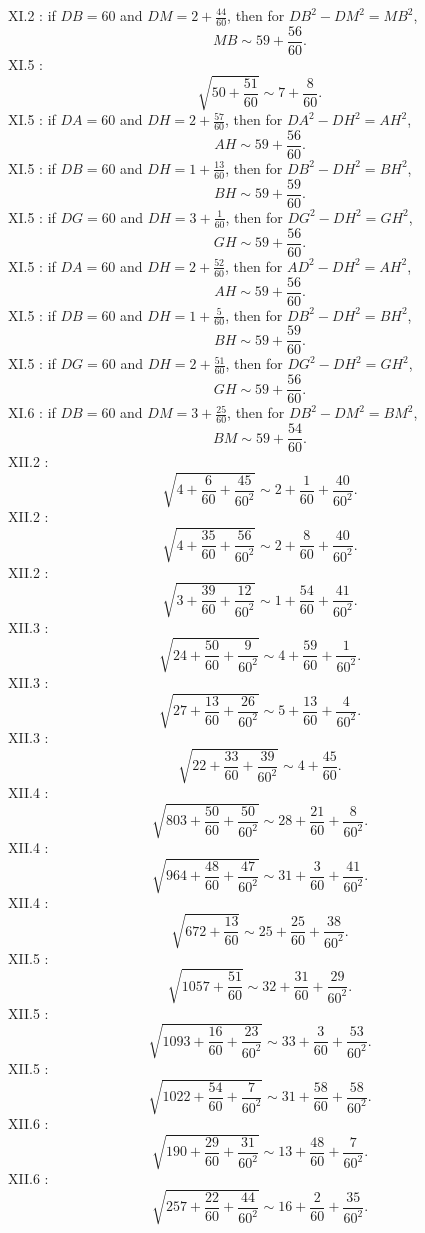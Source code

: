 \documentclass{article}
\theoremstyle{definition}
\begin{document}
XI.2 \cite[p.~521]{almagest}: if $DB=60$ and $DM=2+\frac{44}{60}$, then for
$DB^2-DM^2=MB^2$,
\[
MB \sim 59+\frac{56}{60}.
\]
XI.5 \cite[p.~528]{almagest}: 
\[
\sqrt{50+\frac{51}{60}} \sim 7+\frac{8}{60}.
\]
XI.5 \cite[p.~529]{almagest}: if $DA=60$ and $DH=2+\frac{57}{60}$, then for $DA^2-DH^2=AH^2$,
\[
AH \sim 59+\frac{56}{60}.
\]
XI.5 \cite[p.~531]{almagest}: if $DB=60$ and $DH=1+\frac{13}{60}$, then for $DB^2-DH^2=BH^2$,
\[
BH \sim 59+\frac{59}{60}.
\]
XI.5 \cite[p.~533]{almagest}: if $DG=60$ and $DH=3+\frac{1}{60}$, then for $DG^2-DH^2=GH^2$,
\[
GH \sim 59+\frac{56}{60}.
\]
XI.5 \cite[p.~534]{almagest}: if $DA=60$ and $DH=2+\frac{52}{60}$, then for $AD^2-DH^2=AH^2$,
\[
AH \sim 59+\frac{56}{60}.
\]
XI.5 \cite[pp.~535--536]{almagest}: if $DB=60$ and $DH=1+\frac{5}{60}$, then for $DB^2-DH^2=BH^2$,
\[
BH \sim 59+\frac{59}{60}.
\]
XI.5 \cite[p.~537]{almagest}: if $DG=60$ and $DH=2+\frac{51}{60}$, then for $DG^2-DH^2=GH^2$,
\[
GH \sim 59+\frac{56}{60}.
\]
XI.6 \cite[p.~540]{almagest}: if $DB=60$ and $DM=3+\frac{25}{60}$, then for $DB^2-DM^2=BM^2$,
\[
BM \sim 59+\frac{54}{60}.
\]
XII.2 \cite[p.~564]{almagest}: 
\[
\sqrt{4+\frac{6}{60}+\frac{45}{60^2}} \sim 2+\frac{1}{60}+\frac{40}{60^2}.
\]
XII.2 \cite[p.~566]{almagest}:
\[
\sqrt{4+\frac{35}{60}+\frac{56}{60^2}} \sim 2+\frac{8}{60}+\frac{40}{60^2}.
\]
XII.2 \cite[p.~568]{almagest}:
\[
\sqrt{3+\frac{39}{60}+\frac{12}{60^2}} \sim 1+\frac{54}{60}+\frac{41}{60^2}.
\]
XII.3 \cite[p.~570]{almagest}:
\[
\sqrt{24+\frac{50}{60}+\frac{9}{60^2}} \sim 4+\frac{59}{60}+\frac{1}{60^2}.
\]
XII.3 \cite[p.~571]{almagest}:
\[
\sqrt{27+\frac{13}{60}+\frac{26}{60^2}} \sim 5+\frac{13}{60}+\frac{4}{60^2}.
\]
XII.3 \cite[p.~571]{almagest}:
\[
\sqrt{22+\frac{33}{60}+\frac{39}{60^2}} \sim 4+\frac{45}{60}.
\]
XII.4 \cite[p.~572]{almagest}:
\[
\sqrt{803+\frac{50}{60}+\frac{50}{60^2}} \sim 28+\frac{21}{60}+\frac{8}{60^2}.
\]
XII.4 \cite[p.~574]{almagest}:
\[
\sqrt{964+\frac{48}{60}+\frac{47}{60^2}} \sim 31+\frac{3}{60}+\frac{41}{60^2}.
\]
XII.4 \cite[pp.~574--575]{almagest}:
\[
\sqrt{672+\frac{13}{60}} \sim 25+\frac{25}{60}+\frac{38}{60^2}.
\]
XII.5 \cite[pp.~575--576]{almagest}:
\[
\sqrt{1057+\frac{51}{60}} \sim 32+\frac{31}{60}+\frac{29}{60^2}.
\]
XII.5 \cite[p.~577]{almagest}:
\[
\sqrt{1093+\frac{16}{60}+\frac{23}{60^2}} \sim 33+\frac{3}{60}+\frac{53}{60^2}.
\]
XII.5 \cite[p.~578]{almagest}:
\[
\sqrt{1022+\frac{54}{60}+\frac{7}{60^2}} \sim 31+\frac{58}{60}+\frac{58}{60^2}.
\]
XII.6 \cite[p.~579]{almagest}:
\[
\sqrt{190+\frac{29}{60}+\frac{31}{60^2}} \sim 13+\frac{48}{60}+\frac{7}{60^2}.
\]
XII.6 \cite[p.~580]{almagest}:
\[
\sqrt{257+\frac{22}{60}+\frac{44}{60^2}} \sim 16+\frac{2}{60}+\frac{35}{60^2}.
\]
\end{document}
